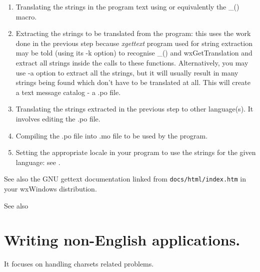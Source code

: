 \begin{enumerate}\itemsep=0pt
\item Translating the strings in the program text using 
 or equivalently the \_() macro.
\item Extracting the strings to be translated from the program: this uses the
work done in the previous step because {\it xgettext} program used for string
extraction may be told (using its -k option) to recognise \_() and
wxGetTranslation and extract all strings inside the calls to these functions.
Alternatively, you may use -a option to extract all the strings, but it will
usually result in many strings being found which don't have to be translated at
all. This will create a text message catalog - a .po file.
\item Translating the strings extracted in the previous step to other
language(s). It involves editing the .po file.
\item Compiling the .po file into .mo file to be used by the program.
\item Setting the appropriate locale in your program to use the strings for the
given language: see .
\end{enumerate}

See also the GNU gettext documentation linked from {\tt docs/html/index.htm} in
your wxWindows distribution.

See also
\section{Writing non-English applications.}\label{nonenglishoverview} 
It focuses on handling charsets related problems.

